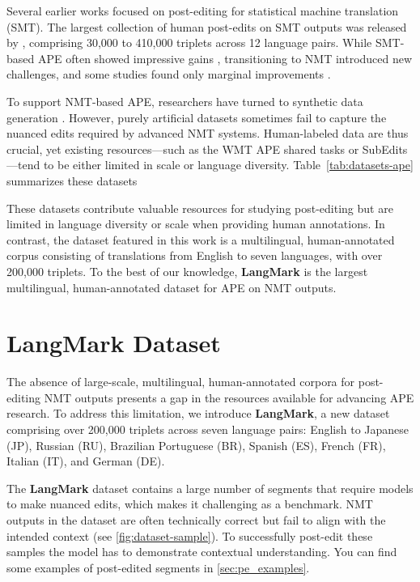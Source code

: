 \documentclass[11pt]{article}
\theoremstyle{plain}
\theoremstyle{definition}
\theoremstyle{remark}
\begin{document}
Several earlier works focused on post-editing for statistical machine translation (SMT). The largest collection of human post-edits on SMT outputs was released by \citet{zhechev2012machine}, comprising 30,000 to 410,000 triplets across 12 language pairs. While SMT-based APE often showed impressive gains \citep{junczys-dowmunt-2017-amu, tebbifakhr-etal-2018-multi}, transitioning to NMT introduced new challenges, and some studies found only marginal improvements \citep{chatterjee-etal-2019-findings, junczys-dowmunt-grundkiewicz-2018-ms}.

To support NMT-based APE, researchers have turned to synthetic data generation \citep{junczys-dowmunt-grundkiewicz-2016-log, freitag-etal-2019-ape, specia-etal-2017-translation, negri2018online, li-etal-2024-towards-demonstration}. However, purely artificial datasets sometimes fail to capture the nuanced edits required by advanced NMT systems. Human-labeled data are thus crucial, yet existing resources—such as the WMT APE shared tasks \citep{chatterjee-etal-2018-findings, chatterjee-etal-2019-findings} or SubEdits \citep{chollampatt2020pedra}—tend to be either limited in scale or language diversity. Table~\ref{tab:datasets-ape} summarizes these datasets

These datasets contribute valuable resources for studying post-editing but are limited in language diversity or scale when providing human annotations. In contrast, the dataset featured in this work is a multilingual, human-annotated corpus consisting of translations from English to seven languages, with over  200,000 triplets. To the best of our knowledge, \textbf{LangMark} is the largest multilingual, human-annotated dataset for APE on NMT outputs.


\section{LangMark Dataset}
The absence of large-scale, multilingual, human-annotated corpora for post-editing NMT outputs presents a gap in the resources available for advancing APE research. To address this limitation, we introduce \textbf{LangMark}, a new dataset comprising over 200,000 triplets across seven language pairs: English to Japanese (JP), Russian (RU), Brazilian Portuguese (BR), Spanish (ES), French (FR), Italian (IT), and German (DE).

The \textbf{LangMark} dataset contains a large number of segments that require models to make nuanced edits, which makes it challenging as a benchmark. NMT outputs in the dataset are often technically correct but fail to align with the intended context (see \cref{fig:dataset-sample}). To successfully post-edit these samples the model has to demonstrate contextual understanding. You can find some examples of post-edited segments in \ref{sec:pe_examples}.
\end{document}
